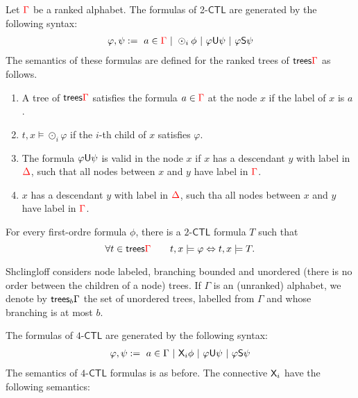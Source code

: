 Let ${\color{red}{\Gamma}}$ be a ranked alphabet. The formulas of 2-$\mathsf{CTL}$ are generated by the following syntax:
\begin{align*}
\varphi, \psi:= \ a\in {\color{red}{\Gamma}} \ | \ \odot_i \phi \ | \ \varphi\mathsf U \psi \ | \ \varphi\mathsf S\psi  
\end{align*}
The semantics of these formulas are defined for the ranked trees of $\mathsf {trees} {\color{red}{\Gamma}}$ as follows.
\begin{enumerate}
\item A tree of $\mathsf {trees} {\color{red}{\Gamma}}$ satisfies the formula $a\in{\color{red}{\Gamma}}$ at the node $x$ if the label of $x$ is $a$.
\item $t, x\models \odot_i \varphi$ if the $i$-th child of $x$ satisfies $\varphi$.
\item  The formula $\varphi\mathsf U \psi$  is valid  in the node $x$ if $x$ has a descendant $y$ with label in ${\color{red}{\Delta}}$, such that all nodes between $x$ and $y$ have label in ${\color{red}{\Gamma}}$. 
\item $x$ has a descendant $y$ with label in ${\color{red}{\Delta}}$, such tha all nodes between $x$ and $y$ have label in ${\color{red}{\Gamma}}$.
\end{enumerate}

\begin{lemma}%
For every first-ordre formula $\phi$, there is a $2$-$\mathsf{CTL}$ formula $T$ such that
$$ \forall t\in \mathsf {trees} {\color{red}{\Gamma}} \qquad t,x\models \varphi \Leftrightarrow t,x\models T.$$
\end{lemma}

Shclingloff considers node labeled, branching bounded and   unordered (there is no order between the children of a node) trees. If $\Gamma$ is an (unranked) alphabet, we denote by $\mathsf {trees}_b\Gamma$ the set of unordered trees, labelled from $\Gamma$ and whose branching is at most $b$.   


The formulas of $4$-$\mathsf{CTL}$ are generated by the following syntax:
\begin{align*}
\varphi, \psi:= \ a\in \Gamma \ | \ \nextmod_i \phi \ | \ \varphi\untilmod \psi \ | \ \varphi\sincemod\psi  
\end{align*}
The semantics of $4$-$\mathsf{CTL}$ formulas is as before. The connective $\mathsf X_i$ have the following semantics:
%


